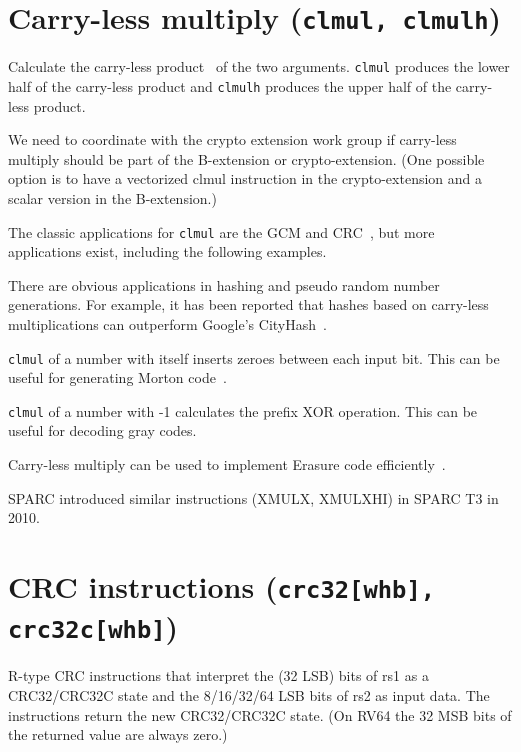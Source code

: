 \section{Carry-less multiply (\texttt{clmul, clmulh})}

Calculate the carry-less product~\cite{CarryLessProduct} of the two arguments. \texttt{clmul}
produces the lower half of the carry-less product and \texttt{clmulh} produces the upper half
of the carry-less product.

We need to coordinate with the crypto extension work group if carry-less multiply should
be part of the B-extension or crypto-extension. (One possible option is to have a vectorized
clmul instruction in the crypto-extension and a scalar version in the B-extension.)



The classic applications for \texttt{clmul} are the GCM and CRC~\cite{FastCRC}, but more
applications exist, including the following examples.

There are obvious applications in hashing and pseudo random number generations. For
example, it has been reported that hashes based on carry-less multiplications can
outperform Google's CityHash~\cite{CLHASH}.

\texttt{clmul} of a number with itself inserts zeroes between each input bit. This can
be useful for generating Morton code~\cite{MortonCode}.

\texttt{clmul} of a number with -1 calculates the prefix XOR operation. This can
be useful for decoding gray codes.

Carry-less multiply can be used to implement Erasure code efficiently~\cite{ClmulErasureCode}.

SPARC introduced similar instructions (XMULX, XMULXHI) in SPARC T3 in 2010.


\section{CRC instructions (\texttt{crc32[whb], crc32c[whb]})}

R-type CRC instructions that interpret the (32 LSB) bits of rs1 as a
CRC32/CRC32C state and the 8/16/32/64 LSB bits of rs2 as input data. The
instructions return the new CRC32/CRC32C state. (On RV64 the 32 MSB bits
of the returned value are always zero.)

